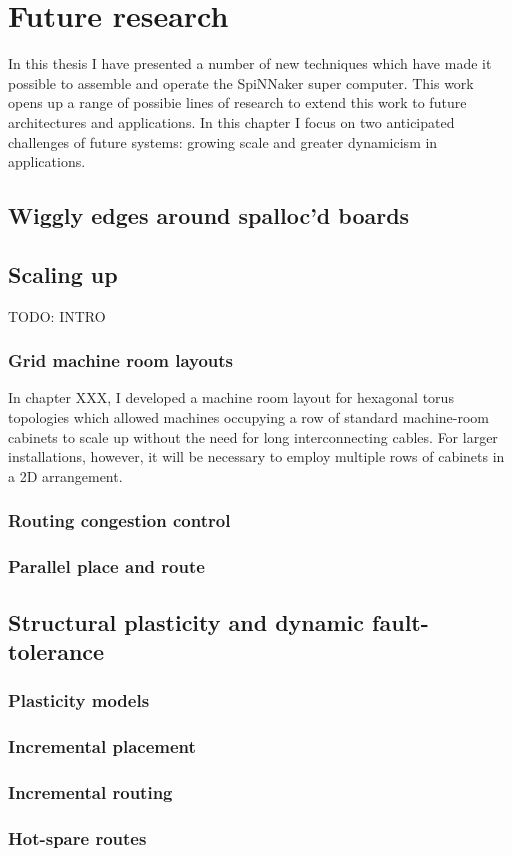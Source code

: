 \chapter{Future research}
	
	In this thesis I have presented a number of new techniques which have made it
	possible to assemble and operate the SpiNNaker super computer. This work
	opens up a range of possibie lines of research to extend this work to future
	architectures and applications. In this chapter I focus on two anticipated
	challenges of future systems: growing scale and greater dynamicism in
	applications.
	
	\section{Wiggly edges around spalloc'd boards}
		
		\label{sec:wiggly-board-allocations}
	
	\section{Scaling up}
		
		TODO: INTRO
		
		\subsection{Grid machine room layouts}
			
			In chapter XXX, I developed a machine room layout for hexagonal torus
			topologies which allowed machines occupying a row of standard
			machine-room cabinets to scale up without the need for long
			interconnecting cables. For larger installations, however, it will be
			necessary to employ multiple rows of cabinets in a 2D arrangement.
		
		\subsection{Routing congestion control}
		
		\subsection{Parallel place and route}
	
	\section{Structural plasticity and dynamic fault-tolerance}
		\subsection{Plasticity models}
		\subsection{Incremental placement}
		\subsection{Incremental routing}
		\subsection{Hot-spare routes}
